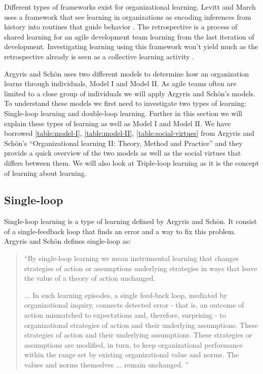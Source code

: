 Different types of frameworks exist for organizational learning. Levitt and March uses a framework that see learning in organizations as encoding inferences from history into routines that guide behavior \cite{Levitt1988}. The retrospective is a process of shared learning for an agile development team learning from the last iteration of development. Investigating learning using this framework won't yield much as the retrospective already is seen as a collective learning activity \cite{Dingsoyr2004}. 

Argyris and Schön \cite{Argyris1996} uses two different models to determine how an organization learns through individuals, Model I and Model II. As agile teams often are limited to a close group of individuals we will apply Argyris and Schön's models. To understand these models we first need to investigate two types of learning: Single-loop learning and double-loop learning. Further in this section we will explain these types of learning as well as Model I and Model II. We have borrowed \autoref{table:model-I}, \autoref{table:model-II}, \autoref{table:social-virtues} from Argyris and Schön's ``Organizational learning II: Theory, Method and Practice''\cite{Argyris1996} and they provide a quick overview of the two models as well as the social virtues that differs between them. We will also look at Triple-loop learning as it is the concept of learning about learning. 

\subsection{Single-loop}
Single-loop learning is a type of learning defined by Argyris and Schön. It consist of a single-feedback loop that finds an error and a way to fix this problem. Argyris and Schön \cite{Argyris1996} defines single-loop as: 

\begin{quote}
``By single-loop learning we mean instrumental learning that changes strategies of action or assumptions underlying strategies in ways that leave the value of a theory of action unchanged.

... In such learning episodes, a single feed-back loop, mediated by organizational inquiry, connects detected error - that is, an outcome of action mismatched to expectations and, therefore, surprising - to organizational strategies of action and their underlying assumptions. These strategies of action and their underlying assumptions. These strategies or assumptions are modified, in turn, to keep organizational performance within the range set by existing organizational value and norms. The values and norms themselves ... remain unchanged. 
''
\end{quote}

